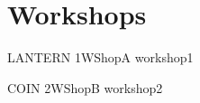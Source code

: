 \chapter[Workshops: \daydate]{Workshops}
\thispagestyle{emptyheader}
\vfill




\clearpage
{}

      \begin{wsschedule}
      {LANTERN}
      {1}{WShopA}
      {workshop1}
      {\WShopLocA}
      
      \end{wsschedule}
      

      \begin{wsschedule}
      {COIN}
      {2}{WShopB}
      {workshop2}
      {\WShopLocB}
      
      \end{wsschedule}




      

      

      

